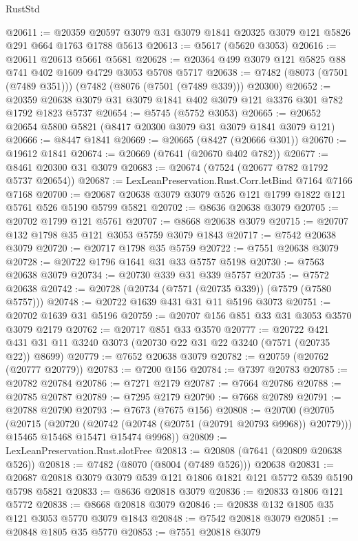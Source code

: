 \begin{lexlean}{RustStd}
\begin{coremodule}
@20611 := @20359 @20597 @3079 @31 @3079 @1841 @20325 @3079 @121 @5826 @291 @664 @1763 @1788 @5613
@20613 := @5617 (@5620 @3053)
@20616 := @20611 @20613 @5661 @5681
@20628 := @20364 @499 @3079 @121 @5825 @88 @741 @402 @1609 @4729 @3053 @5708 @5717
@20638 := @7482 (@8073 (@7501 (@7489 @351))) (@7482 (@8076 (@7501 (@7489 @339))) @20300)
@20652 := @20359 @20638 @3079 @31 @3079 @1841 @402 @3079 @121 @3376 @301 @782 @1792 @1823 @5737
@20654 := @5745 (@5752 @3053)
@20665 := @20652 @20654 @5800 @5821 (@8417 @20300 @3079 @31 @3079 @1841 @3079 @121)
@20666 := @8447 @1841
@20669 := @20665 (@8427 (@20666 @301))
@20670 := @19612 @1841
@20674 := @20669 (@7641 (@20670 @402 @782))
@20677 := @8461 @20300 @31 @3079
@20683 := @20674 (@7524 (@20677 @782 @1792 @5737 @20654))
@20687 := LexLeanPreservation.Rust.Corr.letBind @7164 @7166 @7168
@20700 := @20687 @20638 @3079 @3079 @526 @121 @1799 @1822 @121 @5761 @526 @5190 @5799 @5821
@20702 := @8636 @20638 @3079
@20705 := @20702 @1799 @121 @5761
@20707 := @8668 @20638 @3079
@20715 := @20707 @132 @1798 @35 @121 @3053 @5759 @3079 @1843
@20717 := @7542 @20638 @3079
@20720 := @20717 @1798 @35 @5759
@20722 := @7551 @20638 @3079
@20728 := @20722 @1796 @1641 @31 @33 @5757 @5198
@20730 := @7563 @20638 @3079
@20734 := @20730 @339 @31 @339 @5757
@20735 := @7572 @20638
@20742 := @20728 (@20734 (@7571 (@20735 @339)) (@7579 (@7580 @5757)))
@20748 := @20722 @1639 @431 @31 @11 @5196 @3073
@20751 := @20702 @1639 @31 @5196
@20759 := @20707 @156 @851 @33 @31 @3053 @3570 @3079 @2179
@20762 := @20717 @851 @33 @3570
@20777 := @20722 @421 @431 @31 @11 @3240 @3073 (@20730 @22 @31 @22 @3240 (@7571 (@20735 @22)) @8699)
@20779 := @7652 @20638 @3079
@20782 := @20759 (@20762 (@20777 @20779))
@20783 := @7200 @156
@20784 := @7397 @20783
@20785 := @20782 @20784
@20786 := @7271 @2179
@20787 := @7664 @20786
@20788 := @20785 @20787
@20789 := @7295 @2179
@20790 := @7668 @20789
@20791 := @20788 @20790
@20793 := @7673 (@7675 @156)
@20808 := @20700
    (@20705
      (@20715
        (@20720 (@20742 (@20748 (@20751 (@20791 @20793 @9968)) @20779)))
        @15465
        @15468
        @15471
        @15474
        @9968))
@20809 := LexLeanPreservation.Rust.slotFree
@20813 := @20808 (@7641 (@20809 @20638 @526))
@20818 := @7482 (@8070 (@8004 (@7489 @526))) @20638
@20831 := @20687 @20818 @3079 @3079 @539 @121 @1806 @1821 @121 @5772 @539 @5190 @5798 @5821
@20833 := @8636 @20818 @3079
@20836 := @20833 @1806 @121 @5772
@20838 := @8668 @20818 @3079
@20846 := @20838 @132 @1805 @35 @121 @3053 @5770 @3079 @1843
@20848 := @7542 @20818 @3079
@20851 := @20848 @1805 @35 @5770
@20853 := @7551 @20818 @3079

\end{coremodule}
\end{lexlean}
